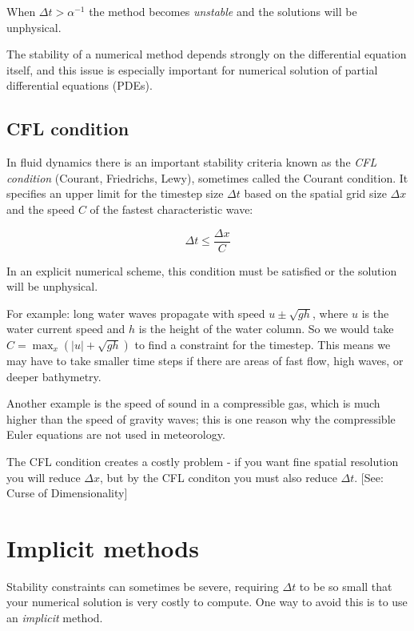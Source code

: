 \documentclass{article}
\newcommand{\dt}{\Delta t}
\begin{document}
When $\dt > \alpha^{-1}$ the method becomes \emph{unstable} and the solutions
will be unphysical.

The stability of a numerical method depends strongly on the differential equation itself,
and this issue is especially important for numerical solution of partial differential equations (PDEs).

\subsection{CFL condition}

In fluid dynamics there is an important stability criteria known as the \emph{CFL condition}
(Courant, Friedrichs, Lewy), sometimes called the Courant condition.
It specifies an upper limit for the timestep size $\Delta t$
based on the spatial grid size $\Delta x$ and the speed $C$ of the fastest 
characteristic wave:

\begin{equation}
    \Delta t \leq \frac{\Delta x}{C}
    \tag{CFL}
\end{equation}

In an explicit numerical scheme, this condition must be satisfied or 
the solution will be unphysical.

For example: long water waves propagate with speed $u \pm \sqrt{gh}$, where
$u$ is the water current speed and $h$ is the height of the water column. So we would take
$C = \max_x (|u| + \sqrt{gh})$ to find a constraint for the timestep.
This means we may have to take smaller time steps if there
are areas of fast flow, high waves, or deeper bathymetry.

Another example is the speed of sound in a compressible gas, which is much higher
than the speed of gravity waves; this is one reason
why the compressible Euler equations are not used in meteorology.

The CFL condition creates a costly problem - if you want fine spatial resolution you will reduce $\Delta x$,
but by the CFL conditon you must also reduce $\Delta t$. [See: Curse of Dimensionality]

\section{Implicit methods}

Stability constraints can sometimes be severe, requiring $\dt$ to be so small that
your numerical solution is very costly to compute. One way to avoid this is to use an
\emph{implicit} method. 
\end{document}
